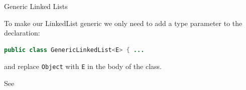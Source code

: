 \documentclass{beamer}
\begin{document}
\begin{frame}[fragile]{Generic Linked Lists}


To make our LinkedList generic we only need to add a type parameter to the declaration:
\begin{lstlisting}[language=Java]
public class GenericLinkedList<E> { ...
\end{lstlisting}

and replace {\tt Object} with {\tt E} in the body of the class.

See 

\end{frame}
\end{document}
